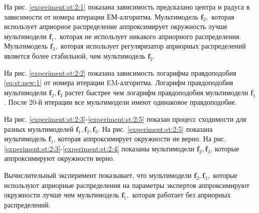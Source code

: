 На рис. \ref{experiment:st:2:1} показана зависимость предсказано центра и радуса в зависимости от номера итерации ЕМ-алгоритма.
Мультимодель $\textbf{f}_2,$ которая использует априорное распределение аппроксимирует окружность лучше мультимодели $\textbf{f}_1,$ которая не использует никакого априорного распределения.
Мультимодель $\textbf{f}_3,$ которая использует регуляризатор априорных распределений является более стабильной, чем мультимодель $\textbf{f}_2$.

На рис. \ref{experiment:st:2:2} показана зависимость логарифма правдоподобия \eqref{eq:st:new:1} от номера итерации EM-алгоритма.
Логарифм правдоподобия мультимодели $\textbf{f}_2, \textbf{f}_3$ растет быстрее чем логарифм правдоподобия мультимодели $\textbf{f}_1$.  После $20$-й итерации все мультимодели имеют одинаковое правдоподобие.

На рис. \ref{experiment:st:2:3}-\ref{experiment:st:2:5} показан процесс сходимости для разных мультимоделей $\textbf{f}_1, \textbf{f}_2, \textbf{f}_3$.
На рис. \ref{experiment:st:2:5} показана мультимодель $\textbf{f}_1$, которая аппроксимирует окружности не верно.
На рис. \ref{experiment:st:2:3}-\ref{experiment:st:2:4} показаны мультимодели $\textbf{f}_2, \textbf{f}_3$, которые аппроксимируют окружности верно.

Вычислительный эксперимент показывает, что мультимодели $\textbf{f}_2, \textbf{f}_3,$ которые используют априорные распределения на параметры экспертов аппроксимируют окружности лучше чем мультимодель $\textbf{f}_1,$ которая работает без априорных распределений.


